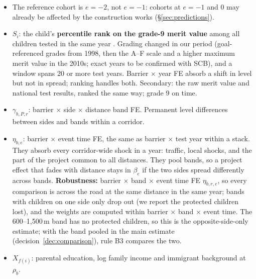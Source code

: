 \documentclass[11pt]{article}
\begin{document}
\begin{itemize}
\item The reference cohort is \(e = -2\), not \(e = -1\): cohorts at \(e = -1\) and \(0\) may
  already be affected by the construction works (\S\ref{sec:predictions}).
\item \(S_i\): the child's \textbf{percentile rank on the grade-9 merit value} among all children
  tested in the same year \autocite[as in][]{gronqvistUnderstandingHowLow2020}. Grading changed
  in our period (goal-referenced grades from 1998, then the A--F scale and a higher maximum
  merit value in the 2010s; exact years to be confirmed with SCB), and a window spans 20 or more
  test years. Barrier \(\times\) year FE absorb a shift in level but not in spread; ranking
  handles both. Secondary: the raw merit value and national test results, ranked the same way;
  grade 9 on time.
\item \(\gamma_{b,P,r}\): barrier \(\times\) side \(\times\) distance band FE. Permanent level
  differences between sides and bands within a corridor.
\item \(\eta_{b,e}\): barrier \(\times\) event time FE, the same as barrier \(\times\) test year
  within a stack. They absorb every corridor-wide shock in a year: traffic, local shocks, and the
  part of the project common to all distances. They pool bands, so a project effect that fades
  with distance stays in \(\beta_e\) if the two sides spread differently across bands.
  \textbf{Robustness:} barrier \(\times\) band \(\times\) event time FE \(\eta_{b,r,e}\), so
  every comparison is across the road at the same distance in the same year; bands with
  children on one side only drop out (we report the protected children lost), and the weights
  are computed within barrier \(\times\) band \(\times\) event time. The 600--1,500\,m band has
  no protected children, so this is the opposite-side-only estimate; with the band pooled in
  the main estimate (decision~\ref{dec:comparison}), rule B3 compares the two.
\item \(X_{f(i)}\): parental education, log family income and immigrant background at
  \(\rho_b\).
\end{itemize}
\end{document}
